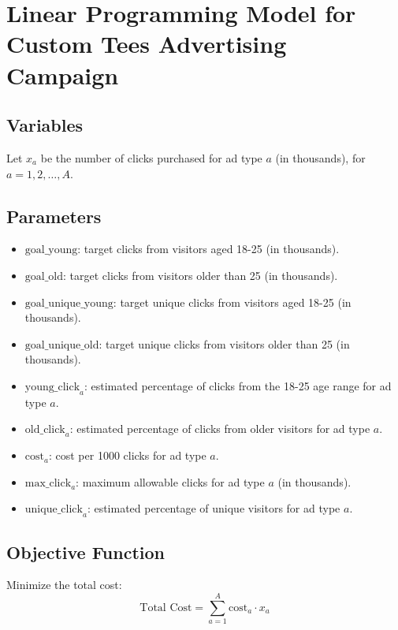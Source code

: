 \documentclass{article}
\begin{document}
\section*{Linear Programming Model for Custom Tees Advertising Campaign}

\subsection*{Variables}
Let \( x_a \) be the number of clicks purchased for ad type \( a \) (in thousands), for \( a = 1, 2, \ldots, A \).

\subsection*{Parameters}
\begin{itemize}
    \item \( \text{goal\_young} \): target clicks from visitors aged 18-25 (in thousands).
    \item \( \text{goal\_old} \): target clicks from visitors older than 25 (in thousands).
    \item \( \text{goal\_unique\_young} \): target unique clicks from visitors aged 18-25 (in thousands).
    \item \( \text{goal\_unique\_old} \): target unique clicks from visitors older than 25 (in thousands).
    \item \( \text{young\_click}_a \): estimated percentage of clicks from the 18-25 age range for ad type \( a \).
    \item \( \text{old\_click}_a \): estimated percentage of clicks from older visitors for ad type \( a \).
    \item \( \text{cost}_a \): cost per 1000 clicks for ad type \( a \).
    \item \( \text{max\_click}_a \): maximum allowable clicks for ad type \( a \) (in thousands).
    \item \( \text{unique\_click}_a \): estimated percentage of unique visitors for ad type \( a \).
\end{itemize}

\subsection*{Objective Function}
Minimize the total cost:
\[
\text{Total Cost} = \sum_{a=1}^{A} \text{cost}_a \cdot x_a
\]
\end{document}
